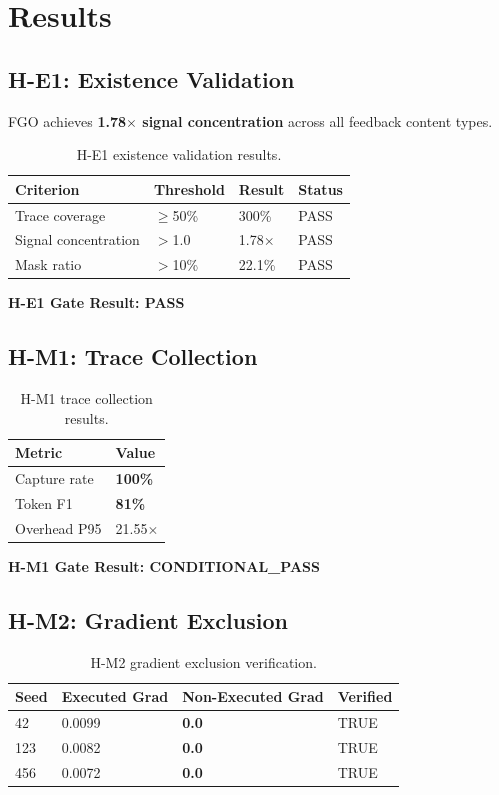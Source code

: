 \section{Results}

\subsection{H-E1: Existence Validation}

FGO achieves \textbf{1.78$\times$ signal concentration} across all feedback content types.

\begin{table}[h]
\centering
\caption{H-E1 existence validation results.}
\label{tab:he1}
\begin{tabular}{@{}llll@{}}
\toprule
Criterion & Threshold & Result & Status \\
\midrule
Trace coverage & $\geq$50\% & 300\% & PASS \\
Signal concentration & $>$1.0 & 1.78$\times$ & PASS \\
Mask ratio & $>$10\% & 22.1\% & PASS \\
\bottomrule
\end{tabular}
\end{table}

\textbf{H-E1 Gate Result: PASS}

\subsection{H-M1: Trace Collection}

\begin{table}[h]
\centering
\caption{H-M1 trace collection results.}
\label{tab:hm1}
\begin{tabular}{@{}ll@{}}
\toprule
Metric & Value \\
\midrule
Capture rate & \textbf{100\%} \\
Token F1 & \textbf{81\%} \\
Overhead P95 & 21.55$\times$ \\
\bottomrule
\end{tabular}
\end{table}

\textbf{H-M1 Gate Result: CONDITIONAL\_PASS}

\subsection{H-M2: Gradient Exclusion}

\begin{table}[h]
\centering
\caption{H-M2 gradient exclusion verification.}
\label{tab:hm2}
\begin{tabular}{@{}llll@{}}
\toprule
Seed & Executed Grad & Non-Executed Grad & Verified \\
\midrule
42 & 0.0099 & \textbf{0.0} & TRUE \\
123 & 0.0082 & \textbf{0.0} & TRUE \\
456 & 0.0072 & \textbf{0.0} & TRUE \\
\bottomrule
\end{tabular}
\end{table}

